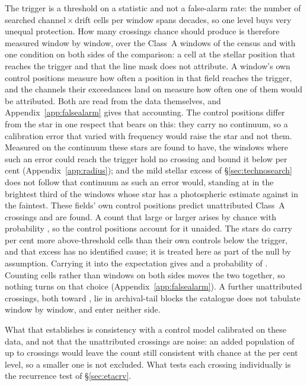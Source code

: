 The trigger is a threshold on a statistic and not a false-alarm rate: the
number of searched channel\,$\times$\,drift cells per window spans
\TuCellsDecades{} decades, so one level buys very unequal protection. How
many crossings chance should produce is therefore measured window by window,
over the \CeNWin{} Class~A windows of the census and with one condition on
both sides of the comparison: a cell at the stellar position that reaches the
trigger and that the line mask does not attribute. A window's own \NCtrl{} control positions measure how often a position in
that field reaches the trigger, and the channels their exceedances land on
measure how often one of them would be attributed. Both are read from the
data themselves, and Appendix~\ref{app:falsealarm} gives that accounting. The control positions differ from the star in one respect that
bears on this: they carry no continuum, so a calibration error that varied
with frequency would raise the star and not them. Measured on the continuum
these stars are found to have, the windows where such an error could reach
the trigger hold no crossing and bound it below \CxResidHiPct{} per cent
(Appendix~\ref{app:radius}); and the mild stellar excess of
\S\ref{sec:technosearch} does not follow that continuum as such an error
would, standing at \CkRatioContBright{} in the brightest third of the
\CkNContWin{} windows whose star has a photospheric estimate against
\CkRatioContFaint{} in the faintest. These fields' own control positions predict \CeExp{} unattributed
Class~A crossings and \CeObs{} are found. A count that large or larger arises
by chance with probability \CeProbNull, so the control positions account for
it unaided. The stars do carry \CeStepPct{} per cent more above-threshold
cells than their own controls below the trigger, and that excess has no
identified cause; it is treated here as part of the null by assumption.
Carrying it into the expectation gives \CeExpX{} and a probability of
\CeProbStep. Counting cells rather than windows on both sides moves the two
together, so nothing turns on that choice (Appendix~\ref{app:falsealarm}). A further \CeNTailCrossWord{} unattributed
crossings, both toward \CeTailStar, lie in archival-tail blocks the catalogue
does not tabulate window by window, and enter neither side.

What that establishes is consistency with a control model calibrated on these
data, and not that the unattributed crossings are noise: an added population
of up to \CeAddLim{} crossings would leave the count still consistent with
chance at the \CeCovPct{} per cent level, so a smaller one is not excluded. What tests each crossing individually is the
recurrence test of \S\ref{sec:etacrv}.

